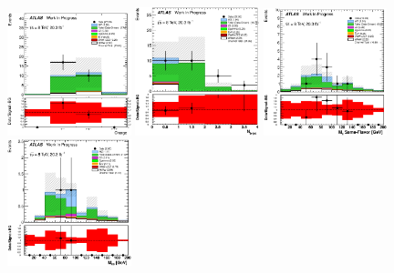 \begin{figure}[ht!]
\centering
\includegraphics[width=0.32\textwidth]{figures/appendix_signal_selection/Nov24Update_FakeSys_KFacSys_LinearY_Rebin/output/jobs/MxM/DataFull_Rates_May13_FakeRatesExactly2Loose_MuonMxMBJetGt0_ElBJetGt0SubtractPC_MxM/PreselectionNov23_15_0SFOS_physics/weight_all/eps/TotalCharge_histratio.eps}
\includegraphics[width=0.32\textwidth]{figures/appendix_signal_selection/Nov24Update_FakeSys_KFacSys_LinearY_Rebin/output/jobs/MxM/DataFull_Rates_May13_FakeRatesExactly2Loose_MuonMxMBJetGt0_ElBJetGt0SubtractPC_MxM/PreselectionNov23_15_0SFOS_ChargeAbs1_physics/weight_all/eps/NBTaggedJets_histratio.eps}
\includegraphics[width=0.32\textwidth]{figures/appendix_signal_selection/Nov24Update_FakeSys_KFacSys_LinearY_Rebin/output/jobs/MxM/DataFull_Rates_May13_FakeRatesExactly2Loose_MuonMxMBJetGt0_ElBJetGt0SubtractPC_MxM/PreselectionNov23_15_0SFOS_ChargeAbs1_BVeto85_physics/weight_all/eps/InvariantMassSF_histratio.eps}
\includegraphics[width=0.32\textwidth]{figures/appendix_signal_selection/Nov24Update_FakeSys_KFacSys_LinearY_Rebin/output/jobs/MxM/DataFull_Rates_May13_FakeRatesExactly2Loose_MuonMxMBJetGt0_ElBJetGt0SubtractPC_MxM/PreselectionNov23_15_0SFOS_ChargeAbs1_BVeto85_SFMllGt20_physics/weight_all/eps/InvariantMassElEl_histratio.eps}

\end{figure}
